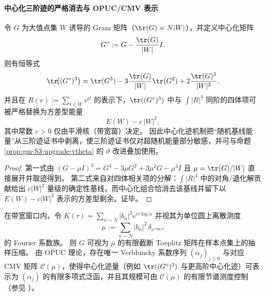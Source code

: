 \paragraph{中心化三阶迹的严格消去与 OPUC/CMV 表示}
\begin{proposition}\label{prop:gm-centered-trace3-energy-variance}
令 \(G\) 为大值点集 \(W\) 诱导的 Gram 矩阵（\(\tr(G)\asymp N|W|\)），并定义中心化矩阵
\[
G^\circ:=G-\frac{\tr(G)}{|W|}I.
\]
则有恒等式
\[
\tr\!\bigl((G^\circ)^3\bigr)
=\tr(G^3)-3\frac{\tr(G)}{|W|}\tr(G^2)+2\frac{\tr(G)^3}{|W|^2}.
\]
并且在 \(R(v):=\sum_{t\in W}v^{it}\) 的表示下，\(\tr((G^\circ)^3)\) 中与 \(\int |R|^4\) 同阶的四体项可被严格替换为方差型能量
\[
E(W)-c\,|W|^2,
\]
其中常数 \(c>0\) 仅由平滑核（带宽窗）决定。
因此中心化迹机制把“随机基线能量”从三阶迹证书中剥离，使三阶迹证书仅对超随机能量部分敏感，并可与命题 \ref{prop:gm-S3-upgrade-vtheta} 的 \(\vartheta\) 改进叠加使用。
\end{proposition}

\begin{proof}
第一式由 \((G-\mu I)^3=G^3-3\mu G^2+3\mu^2G-\mu^3I\) 且 \(\mu=\tr(G)/|W|\) 直接展开并取迹得到。
第二式来自对四体相关项的分解：\(\int |R|^4\) 中的对角/退化解贡献给出 \(c|W|^2\) 量级的确定性基线，而中心化组合恰消去该基线并留下以 \(E(W)-c|W|^2\) 表示的方差型剩余。证毕。
\end{proof}

\begin{proposition}\label{prop:gm-toeplitz-cmv-verblunsky-embedding}
在带宽窗口内，令
\(
K(\tau)=\sum_{n\sim N}|b_n|^2 e^{i\tau\log n}
\)
并视其为单位圆上离散测度
\[
\mu:=\sum_{n\sim N}|b_n|^2\,\delta_{e^{i\log n}}
\]
的 Fourier 系数族。
则 \(G\) 可视为 \(\mu\) 的有限截断 Toeplitz 矩阵在样本点集上的抽样压缩。
由 OPUC 理论，存在唯一 Verblunsky 系数序列 \((\alpha_j)_{j\ge 0}\) 与对应 CMV 矩阵 \(\mathcal{C}(\mu)\)，使得中心化迹量（例如 \(\tr((G^\circ)^3)\) 与更高阶中心化迹）可表示为 \((\alpha_j)\) 的有限多项式泛函，并且其规模可由 \(\mathcal{C}(\mu)\) 的有限节谱测度控制（参见 \cite{CanteroMoralVelazquez2003CMV,Simon2005OPUC1}）。
\end{proposition}

